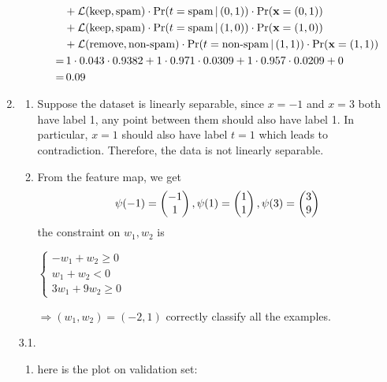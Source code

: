 \documentclass[12pt]{article}
\begin{document}
\begin{enumerate}
\begin{enumerate}
\begin{align*}
      &+ \mathcal{L}(\text{{keep}}, \text{{spam}}) \cdot
      \text{{Pr}}(t = \text{{spam}}\, |\, (0, 1)) \cdot \text{{Pr}}(\textbf x = (0, 1)) \\
      &+ \mathcal{L}(\text{{keep}}, \text{{spam}}) \cdot
      \text{{Pr}}(t = \text{{spam}}\, |\, (1, 0)) \cdot \text{{Pr}}(\textbf x = (1, 0)) \\
      &+ \mathcal{L}(\text{{remove}}, \text{{non-spam}}) \cdot
      \text{{Pr}}(t = \text{{non-spam}}\, |\, (1, 1)) \cdot \text{{Pr}}(\textbf x = (1, 1)) \\
      =& \, 1 \cdot 0.043 \cdot 0.9382 + 1 \cdot 0.971 \cdot 0.0309 + 1 \cdot 0.957 \cdot 0.0209
      + 0 \\
      =& \, 0.09
  \end{align*}
  \end{enumerate}
  \item \begin{enumerate}
    \item Suppose the dataset is linearly separable, since $x = -1$ and $x = 3$ both have label 1, any point between them should also have label 1. In particular, $x = 1$ should also have label $t = 1$ which leads to contradiction. Therefore, the data is not linearly separable.
    \item From the feature map, we get
    $$\psi(-1) = \begin{pmatrix} -1 \\ 1 \end{pmatrix}, \psi(1) = \begin{pmatrix} 1 \\ 1 \end{pmatrix}, \psi(3) = \begin{pmatrix} 3 \\ 9 \end{pmatrix}$$
    the constraint on $w_1, w_2$ is
    \begin{center}
      $\begin{cases}
        -w_1 + w_2 \geq 0 \\
        w_1 + w_2 < 0 \\
        3w_1 + 9w_2 \geq 0
      \end{cases}$
    \end{center}  $\Rightarrow (w_1, w_2) = (-2, 1)$ correctly classify all the examples.
    \end{enumerate}
    \item[3.1.] \begin{enumerate}
    \item here is the plot on validation set:
    \begin{center}

\end{center}
\end{enumerate}
\end{enumerate}
\end{document}
